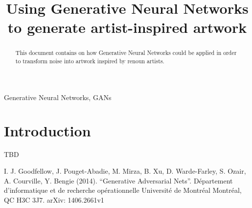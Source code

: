 \documentclass[conference]{IEEEtran}
\begin{document}
\title{Using Generative Neural Networks to generate artist-inspired artwork}

\author{
    \and
}
\maketitle

\begin{abstract}
    This document contains on how Generative Neural Networks could be applied in order to transform noise into artwork
    inspired by renoun artists.
\end{abstract}

\begin{IEEEkeywords}
    Generative Neural Networks, GANs
\end{IEEEkeywords}

\section{Introduction}
TBD

\begin{thebibliography}{00}
     I. J. Goodfellow, J. Pouget-Abadie, M. Mirza, B. Xu, D. Warde-Farley, S. Ozair, A. Courville, Y. Bengie
    (2014). ``Generative Adversarial Nets''. Département d'informatique et de recherche opérationnelle Université de Montréal
    Montréal, QC H3C 3J7. arXiv: 1406.2661v1
\end{thebibliography}
\end{document}
